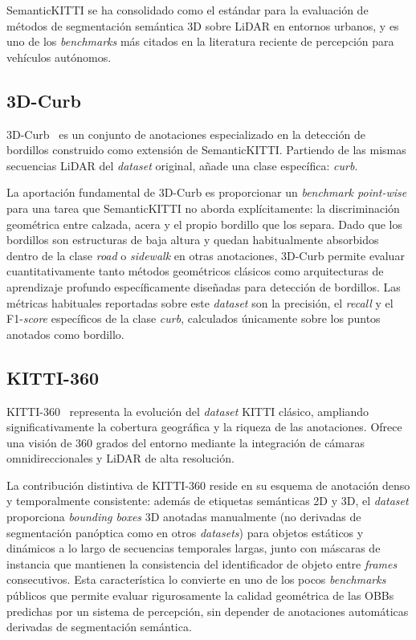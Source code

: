 SemanticKITTI se ha consolidado como el estándar para la evaluación de
métodos de segmentación semántica 3D sobre LiDAR en entornos urbanos, y
es uno de los \textit{benchmarks} más citados en la literatura reciente
de percepción para vehículos autónomos.

\subsection{3D-Curb}
\label{sec:3dcurb}

3D-Curb~\cite{zhao2024curbnet} es un conjunto de anotaciones
especializado en la detección de bordillos construido como extensión de
SemanticKITTI. Partiendo de las mismas secuencias LiDAR del
\textit{dataset} original, añade una clase específica: \textit{curb}.

La aportación fundamental de 3D-Curb es proporcionar un
\textit{benchmark point-wise} para una tarea que SemanticKITTI no
aborda explícitamente: la discriminación geométrica entre calzada,
acera y el propio bordillo que los separa. Dado que los bordillos son
estructuras de baja altura y quedan habitualmente absorbidos dentro de
la clase \textit{road} o \textit{sidewalk} en otras anotaciones,
3D-Curb permite evaluar cuantitativamente tanto métodos geométricos
clásicos como arquitecturas de aprendizaje profundo específicamente
diseñadas para detección de bordillos. Las métricas habituales
reportadas sobre este \textit{dataset} son la precisión, el
\textit{recall} y el F1-\textit{score} específicos de la clase
\textit{curb}, calculados únicamente sobre los puntos anotados como
bordillo.

\subsection{KITTI-360}
\label{sec:kitti360}

KITTI-360~\cite{liao2023kitti360} representa la evolución del
\textit{dataset} KITTI clásico, ampliando significativamente la
cobertura geográfica y la riqueza de las anotaciones. Ofrece una visión
de 360 grados del entorno mediante la integración de cámaras
omnidireccionales y LiDAR de alta resolución.

La contribución distintiva de KITTI-360 reside en su esquema de
anotación denso y temporalmente consistente: además de etiquetas
semánticas 2D y 3D, el \textit{dataset} proporciona \textit{bounding
boxes} 3D anotadas manualmente (no derivadas de segmentación panóptica
como en otros \textit{datasets}) para objetos estáticos y dinámicos a
lo largo de secuencias temporales largas, junto con máscaras de
instancia que mantienen la consistencia del identificador de objeto
entre \textit{frames} consecutivos. Esta característica lo convierte en
uno de los pocos \textit{benchmarks} públicos que permite evaluar
rigurosamente la calidad geométrica de las OBBs predichas por un
sistema de percepción, sin depender de anotaciones automáticas
derivadas de segmentación semántica.

